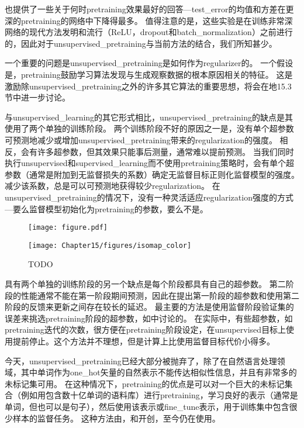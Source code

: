 \cite{Erhan+al-2010-small}也提供了一些关于何时\gls{pretraining}效果最好的回答---\gls{test_error}的均值和方差在更深的\gls{pretraining}的网络中下降得最多。
值得注意的是，这些实验是在训练非常深网络的现代方法发明和流行（\gls{ReLU}，\gls{dropout}和\gls{batch_normalization}）之前进行的，因此对于\gls{unsupervised_pretraining}与当前方法的结合，我们所知甚少。


一个重要的问题是\gls{unsupervised_pretraining}是如何作为\gls{regularizer}的。
一个假设是，\gls{pretraining}鼓励学习算法发现与生成观察数据的根本原因相关的特征。
这是激励除\gls{unsupervised_pretraining}之外的许多其它算法的重要思想，将会在地15.3节中进一步讨论。


与\gls{unsupervised_learning}的其它形式相比，\gls{unsupervised_pretraining}的缺点是其使用了两个单独的训练阶段。
两个训练阶段不好的原因之一是，没有单个超参数可预测地减少或增加\gls{unsupervised_pretraining}带来的\gls{regularization}的强度。
相反，会有许多超参数，但其效果只能事后测量，通常难以提前预测。
当我们同时执行\gls{unsupervised}和\gls{supervised_learning}而不使用\gls{pretraining}策略时，会有单个超参数（通常是附加到无监督损失的系数）确定无监督目标正则化监督模型的强度。
减少该系数，总是可以可预测地获得较少\gls{regularization}。
在\gls{unsupervised_pretraining}的情况下，没有一种灵活适应\gls{regularization}强度的方式---要么监督模型初始化为\gls{pretraining}的参数，要么不是。


\begin{figure}[!htb]
\ifOpenSource
\centerline{\texttt{[image: figure.pdf]}}
\else
\centerline{\texttt{[image: Chapter15/figures/isomap\_color]}}
\fi
\caption{TODO}
\label{fig:chap15_isomap}
\end{figure}


具有两个单独的训练阶段的另一个缺点是每个阶段都具有自己的超参数。
第二阶段的性能通常不能在第一阶段期间预测，因此在提出第一阶段的超参数和使用第二阶段的反馈来更新之间存在较长的延迟。
最主要的方法是使用监督阶段验证集的误差来挑选\gls{pretraining}阶段的超参数，如\cite{Larochelle-jmlr-2009}中讨论的。
在实际中，有些超参数，如\gls{pretraining}迭代的次数，很方便在\gls{pretraining}阶段设定，在\gls{unsupervised}目标上使用提前停止。这个方法并不理想，但是计算上比使用监督目标代价小得多。


今天，\gls{unsupervised_pretraining}已经大部分被抛弃了，除了在自然语言处理领域，其中单词作为\gls{one_hot}矢量的自然表示不能传达相似性信息，并且有非常多的未标记集可用。
在这种情况下，\gls{pretraining}的优点是可以对一个巨大的未标记集合（例如用包含数十亿单词的语料库）进行\gls{pretraining}，学习良好的表示（通常是单词，但也可以是句子），然后使用该表示或\gls{fine_tune}表示，用于训练集中包含很少样本的监督任务。
这种方法由\cite{CollobertR2008-small}，\cite{Turian+Ratinov+Bengio-2010-small}和\cite{collobert2011natural}开创，至今仍在使用。


